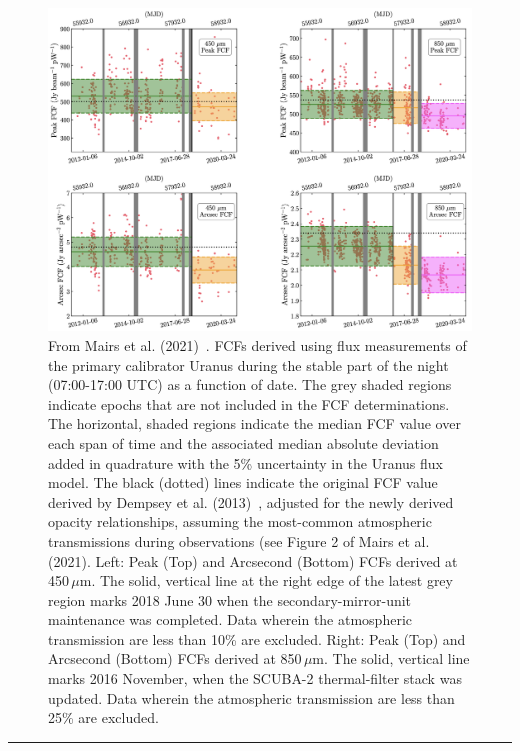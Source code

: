 \begin{center} \begin{figure}
\includegraphics[width=0.9\linewidth]{sc21_FCFstep} \caption[FCF step
function]{From Mairs et al. (2021)~\cite{mairs21}. FCFs derived using
flux measurements of the primary calibrator Uranus during the stable
part of the night (07:00-17:00 UTC) as a function of date. The grey
shaded regions indicate epochs that are not included in the FCF
determinations. The horizontal, shaded regions indicate the median FCF
value over each span of time and the associated median absolute
deviation added in quadrature with the 5\% uncertainty in the Uranus
flux model. The black (dotted) lines indicate the original FCF value
derived by Dempsey et al. (2013)~\cite{dempsey12}, adjusted for the
newly derived opacity relationships, assuming the most-common
atmospheric transmissions during observations (see Figure 2 of Mairs
et al. (2021). Left: Peak (Top) and Arcsecond (Bottom) FCFs derived at
450\,$\mu$m. The solid, vertical line at the right edge of the latest
grey region marks 2018 June 30 when the secondary-mirror-unit
maintenance was completed. Data wherein the atmospheric transmission
are less than 10\% are excluded. Right: Peak (Top) and Arcsecond
(Bottom) FCFs derived at 850\,$\mu$m. The solid, vertical line marks
2016 November, when the SCUBA-2 thermal-filter stack was updated. Data
wherein the atmospheric transmission are less than 25\% are excluded.}

\label{fig:FCFstep}
\end{figure}
\end{center}

\rule{1.0\textwidth}{2pt}

